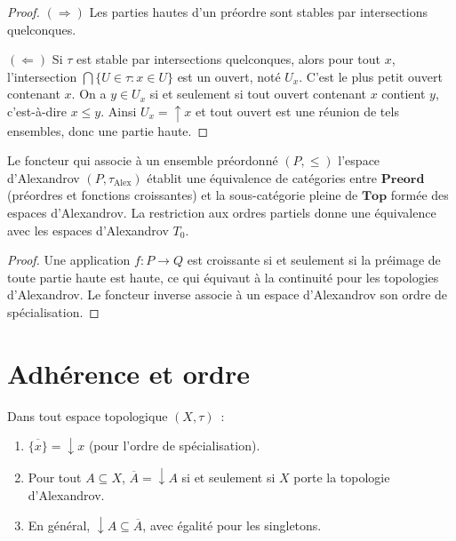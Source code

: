 \begin{proof}
$(\Rightarrow)$ Les parties hautes d'un pr\'eordre sont stables par intersections
quelconques.

$(\Leftarrow)$ Si $\tau$ est stable par intersections quelconques, alors pour tout $x$,
l'intersection $\bigcap\{U \in \tau : x \in U\}$ est un ouvert, not\'e $U_x$. C'est le
plus petit ouvert contenant $x$. On a $y \in U_x$ si et seulement si tout ouvert contenant
$x$ contient $y$, c'est-\`a-dire $x \leq y$. Ainsi $U_x = \uparrow x$ et tout ouvert est
une r\'eunion de tels ensembles, donc une partie haute.
\end{proof}

\begin{proposition}
Le foncteur qui associe \`a un ensemble pr\'eordonn\'e $(P,\leq)$ l'espace d'Alexandrov
$(P, \tau_{\mathrm{Alex}})$ \'etablit une \'equivalence de cat\'egories entre
$\mathbf{Preord}$ (pr\'eordres et fonctions croissantes) et la sous-cat\'egorie pleine
de $\mathbf{Top}$ form\'ee des espaces d'Alexandrov. La restriction aux ordres partiels
donne une \'equivalence avec les espaces d'Alexandrov $T_0$.
\end{proposition}

\begin{proof}
Une application $f\colon P \to Q$ est croissante si et seulement si la pr\'eimage de
toute partie haute est haute, ce qui \'equivaut \`a la continuit\'e pour les topologies
d'Alexandrov. Le foncteur inverse associe \`a un espace d'Alexandrov son ordre de
sp\'ecialisation.
\end{proof}

\section{Adh\'erence et ordre}

\begin{proposition}
Dans tout espace topologique $(X,\tau)$~:
\begin{enumerate}
  \item $\overline{\{x\}} = \downarrow\! x$ (pour l'ordre de sp\'ecialisation).
  \item Pour tout $A \subseteq X$, $\overline{A} = \downarrow\! A$ si et seulement si
    $X$ porte la topologie d'Alexandrov.
  \item En g\'en\'eral, $\downarrow\! A \subseteq \overline{A}$, avec \'egalit\'e pour
    les singletons.
\end{enumerate}
\end{proposition}

